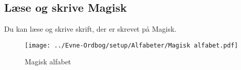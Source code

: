 \subsection{Læse og skrive Magisk}
Du kan læse og skrive skrift, der er skrevet på Magisk.\\
\begin{figure}[H]
    \centering
    \texttt{[image: ../Evne-Ordbog/setup/Alfabeter/Magisk alfabet.pdf]}
    \caption{Magisk alfabet}
\end{figure}